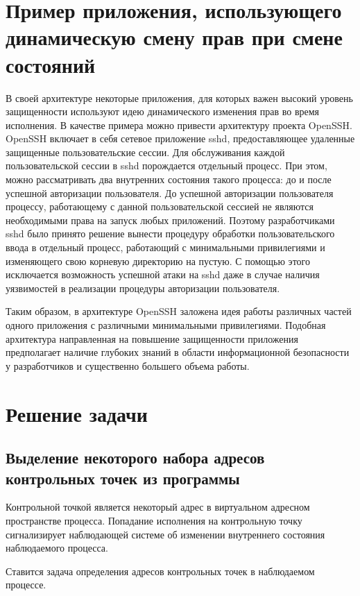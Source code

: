 \section{Пример приложения, использующего 
		динамическую смену прав при смене состояний}
\bigskip 

В своей архитектуре некоторые приложения, 
для которых важен высокий уровень защищенности 
используют идею динамического изменения прав
во время исполнения. В качестве примера можно 
привести архитектуру проекта OpenSSH. OpenSSH
включает в себя сетевое приложение sshd, 
предоставляющее удаленные защищенные пользовательские 
сессии. Для обслуживания каждой пользовательской сессии
в sshd порождается отдельный процесс. При этом, 
можно рассматривать два внутренних состояния такого 
процесса: до и после успешной авторизации пользователя.
До успешной авторизации пользователя процессу, работающему 
с данной пользовательской сессией не являются необходимыми 
права на запуск любых приложений. Поэтому разработчиками 
sshd было принято решение вынести процедуру обработки 
пользовательского ввода в отдельный процесс, 
работающий с минимальными привилегиями и изменяющего 
свою корневую директорию на пустую. С помощью этого 
исключается возможность успешной атаки на sshd даже 
в случае наличия уязвимостей в реализации процедуры 
авторизации пользователя. 

Таким образом, в архитектуре OpenSSH заложена 
идея работы различных частей одного приложения 
с различными минимальными привилегиями. Подобная 
архитектура направленная на повышение защищенности 
приложения предполагает наличие глубоких знаний 
в области информационной безопасности у разработчиков
и существенно большего объема работы.


\section{Решение задачи}

\subsection{Выделение некоторого набора адресов 
		контрольных точек из программы}
\bigskip

Контрольной точкой является некоторый адрес 
в виртуальном адресном пространстве процесса.
Попадание исполнения на контрольную точку 
сигнализирует наблюдающей системе об изменении 
внутреннего состояния наблюдаемого процесса. 

Ставится задача определения адресов контрольных точек 
в наблюдаемом процессе. 

